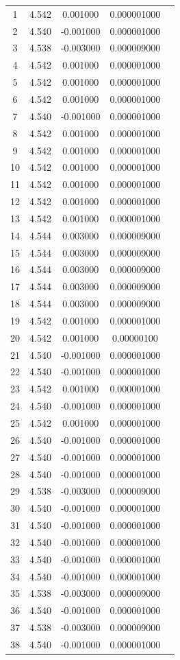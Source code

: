 \begin{center}
\begin{table}[H]
\begin{tabular}{|c|c|c|c|c|}
1  &    4.542  &  0.001000 & 0.000001000 \\
2  &    4.540  &  -0.001000 & 0.000001000 \\
3 &  4.538  &  -0.003000 & 0.000009000 \\
4 &  4.542  &   0.001000 & 0.000001000 \\
5 &  4.542  &  0.001000 & 0.000001000 \\
6 &  4.542  &  0.001000 & 0.000001000 \\
7 &  4.540  &  -0.001000 & 0.000001000 \\
8 &  4.542  &  0.001000 & 0.000001000 \\
9 &  4.542  &  0.001000 & 0.000001000 \\
10 &  4.542  &  0.001000 & 0.000001000 \\
11 &  4.542  &  0.001000 & 0.000001000 \\
12 &  4.542  &  0.001000 & 0.000001000 \\
13 &  4.542  &  0.001000 & 0.000001000 \\
14 &  4.544  &  0.003000 & 0.000009000 \\
15 &  4.544  &  0.003000 & 0.000009000 \\
16 &  4.544  &  0.003000 & 0.000009000 \\
17 &  4.544  &  0.003000 & 0.000009000 \\
18 &  4.544  &  0.003000 & 0.000009000 \\
19 &  4.542  &  0.001000 & 0.000001000 \\
20 &  4.542  &  0.001000 & 0.00000100 \\
21 &  4.540  &  -0.001000 & 0.000001000 \\
22 &  4.540  &  -0.001000 & 0.000001000 \\
23 &  4.542  &  0.001000 & 0.000001000 \\
24 &  4.540  &  -0.001000 & 0.000001000 \\
25 &  4.542  &  0.001000 & 0.000001000 \\
26 &  4.540  &  -0.001000 & 0.000001000 \\
27 &  4.540  &  -0.001000 & 0.000001000 \\
28 &  4.540  &  -0.001000 & 0.000001000 \\
29 &  4.538  &  -0.003000 & 0.000009000 \\
30 &  4.540  &  -0.001000 & 0.000001000 \\
31 &  4.540  &  -0.001000 & 0.000001000 \\
32 &  4.540  &  -0.001000 & 0.000001000 \\
33 &  4.540  &  -0.001000 & 0.000001000 \\
34 &  4.540  &  -0.001000 & 0.000001000 \\
35 &  4.538  &  -0.003000 & 0.000009000 \\
36 &  4.540  &  -0.001000 & 0.000001000 \\
37 &  4.538  &  -0.003000 & 0.000009000 \\
38 &  4.540  &  -0.001000 & 0.000001000 \\
\hline
\end{tabular}
\end{table}
\end{center}
